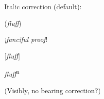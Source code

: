 \documentclass[12pt]{article}
\begin{document}
Italic correction (default):

\begin{center}
(\emph{fluff})

¡\emph{fanciful proof}!

[\emph{fluff}]

\emph{fluff}\textsuperscript{n}
\end{center}

(Visibly, no bearing correction?)
\end{document}
